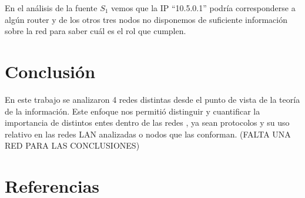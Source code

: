 \documentclass[final,inline,narroweqnarray,a4paper]{ieee}
\begin{document}
En el análisis de la fuente $S_1$ vemos que la IP ``10.5.0.1'' podría corresponderse a algún router y de los otros tres nodos no disponemos de suficiente información sobre la red para saber cuál es el rol que cumplen.

\section{Conclusión}
En este trabajo se analizaron 4 redes distintas desde el punto de vista de la teoría de la información. Este enfoque nos permitió distinguir y cuantificar la importancia de distintos entes dentro de las redes , ya sean protocolos y su uso relativo en las redes LAN analizadas o nodos que las conforman. (FALTA UNA RED PARA LAS CONCLUSIONES)


\section{Referencias}
\end{document}
